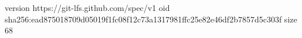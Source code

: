 version https://git-lfs.github.com/spec/v1
oid sha256:ead875018709d05019f1fc08f12c73a1317981ffc25e82e46df2b7857d5c303f
size 68
